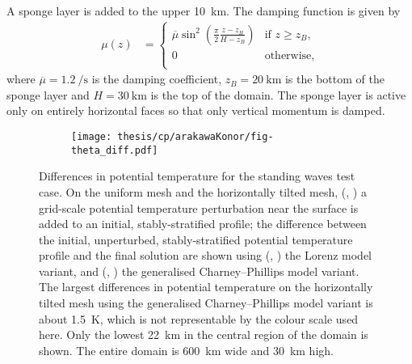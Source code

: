 A sponge layer is added to the upper \SI{10}{\kilo\meter}.  The damping function is given by
\begin{align}
	\mu(z) &= \begin{cases}
		\overline{\mu} \sin^2 \left( \frac{\pi}{2} \frac{z - z_B}{H - z_B} \right) & \text{if $z \geq z_B$,} \\
		0 & \text{otherwise,} \\
	\end{cases}
\end{align}
where $\overline{\mu} = \SI{1.2}{\per\second}$ is the damping coefficient, $z_B = \SI{20}{\kilo\meter}$ is the bottom of the sponge layer and $H = \SI{30}{\kilo\meter}$ is the top of the domain.
The sponge layer is active only on entirely horizontal faces so that only vertical momentum is damped.


\begin{figure}
	\centering
	\begin{subfigure}{\textwidth}
		\label{fig:cp:arakawaKonor:theta_diff:uniform:initial}
		\label{fig:cp:arakawaKonor:theta_diff:uniform:lorenz}
		\label{fig:cp:arakawaKonor:theta_diff:uniform:cp}
		\label{fig:cp:arakawaKonor:theta_diff:hEdgeGrading:initial}
		\label{fig:cp:arakawaKonor:theta_diff:hEdgeGrading:lorenz}
		\label{fig:cp:arakawaKonor:theta_diff:hEdgeGrading:cp}
		\texttt{[image: thesis/cp/arakawaKonor/fig-theta\_diff.pdf]}
	\end{subfigure}
%
	\caption{
	Differences in potential temperature for the standing waves test case.
	On the uniform mesh and the horizontally tilted mesh,
	(,
	)
	a grid-scale potential temperature perturbation near the surface is added to an initial, stably-stratified profile;
the difference between the initial, unperturbed, stably-stratified potential temperature profile and the final solution are shown using
	(,
	)
	the Lorenz model variant, and 
	(,
	)
	the generalised Charney--Phillips model variant.
	The largest differences in potential temperature on the horizontally tilted mesh using the generalised Charney--Phillips model variant is about \SI{1.5}{\kelvin}, which is not representable by the colour scale used here.
Only the lowest \SI{22}{\kilo\meter} in the central region of the domain is shown.  The entire domain is \SI{600}{\kilo\meter} wide and \SI{30}{\kilo\meter} high.
	}
	\label{fig:cp:arakawaKonor:theta_diff}
\end{figure}

